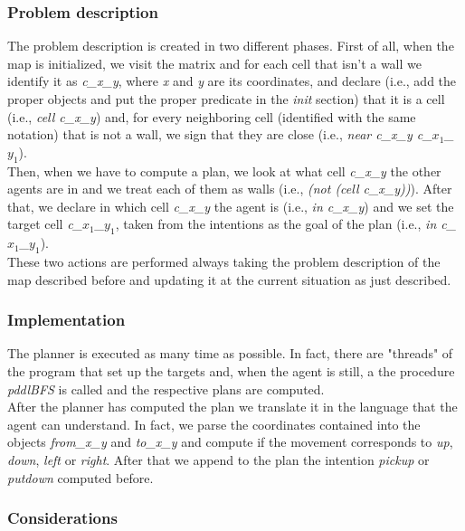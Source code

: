 \documentclass[a4paper, 11pt]{article}
\begin{document}
\subsubsection{Problem description}

The problem description is created in two different phases.
First of all, when the map is initialized, we visit the matrix and for each cell that isn't a wall we identify it as \emph{c\_x\_y}, where \emph{x} and \emph{y} are its coordinates, and declare (i.e., add the proper objects and put the proper predicate in the \emph{init} section) that it is a cell (i.e., \emph{cell c\_x\_y}) and, for every neighboring cell (identified with the same notation) that is not a wall, we sign that they are close (i.e., \emph{near c\_x\_y c\_\(x_1\)\_\(y_1\)}).\\
Then, when we have to compute a plan, we look at what cell \emph{c\_x\_y} the other agents are in and we treat each of them as walls (i.e., \emph{(not (cell c\_x\_y))}). After that, we declare in which cell \emph{c\_x\_y} the agent is (i.e., \emph{in c\_x\_y}) and we set the target cell \emph{c\_\(x_1\)\_\(y_1\)}, taken from the intentions as the goal of the plan (i.e., \emph{in c\_\(x_1\)\_\(y_1\)}).\\
These two actions are performed always taking the problem description of the map described before and updating it at the current situation as just described.

\subsubsection{Implementation}

The planner is executed as many time as possible. In fact, there are "threads" of the program that set up the targets and, when the agent is still, a the procedure \emph{pddlBFS} is called and the respective plans are computed.\\

After the planner has computed the plan we translate it in the language that the agent can understand. In fact, we parse the coordinates contained into the objects \emph{from\_x\_y} and \emph{to\_x\_y} and compute if the movement corresponds to \emph{up}, \emph{down}, \emph{left} or \emph{right}. After that we append to the plan the intention \emph{pickup} or \emph{putdown} computed before.\\

\subsubsection{Considerations}
\end{document}
